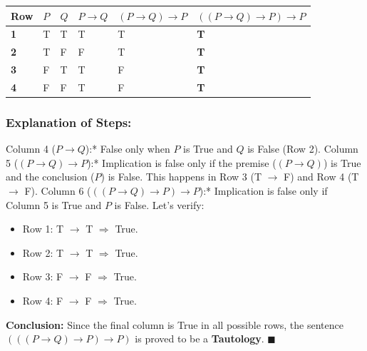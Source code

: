 \begin{table}[H]
\centering
\begin{tabular}{|p{}|p{}|p{}|p{}|p{}|p{}|}
\hline
Row & $P$ & $Q$ & $P \rightarrow Q$ & $(P \rightarrow Q) \rightarrow P$ & $((P \rightarrow Q) \rightarrow P) \rightarrow P$ \\
\hline
\textbf{1} & T & T & T & T & \textbf{T} \\
\hline
\textbf{2} & T & F & F & T & \textbf{T} \\
\hline
\textbf{3} & F & T & T & F & \textbf{T} \\
\hline
\textbf{4} & F & F & T & F & \textbf{T} \\
\hline
\end{tabular}
\end{table}

\subsubsection{Explanation of Steps:}
\textit{   }Column 4 ($P \rightarrow Q$):* False only when $P$ is True and $Q$ is False (Row 2).
\textit{   }Column 5 ($(P \rightarrow Q) \rightarrow P$):* Implication is false only if the premise ($(P \rightarrow Q)$) is True and the conclusion ($P$) is False. This happens in Row 3 (T $\rightarrow$ F) and Row 4 (T $\rightarrow$ F).
\textit{   }Column 6 ($((P \rightarrow Q) \rightarrow P) \rightarrow P$):* Implication is false only if Column 5 is True and $P$ is False. Let's verify:
\begin{itemize}
  \item   Row 1: T $\rightarrow$ T $\Rightarrow$ True.
  \item   Row 2: T $\rightarrow$ T $\Rightarrow$ True.
  \item   Row 3: F $\rightarrow$ F $\Rightarrow$ True.
  \item   Row 4: F $\rightarrow$ F $\Rightarrow$ True.
\end{itemize}

\textbf{Conclusion:} Since the final column is True in all possible rows, the sentence $(((P \rightarrow Q) \rightarrow P) \rightarrow P)$ is proved to be a \textbf{Tautology}. $\blacksquare$


